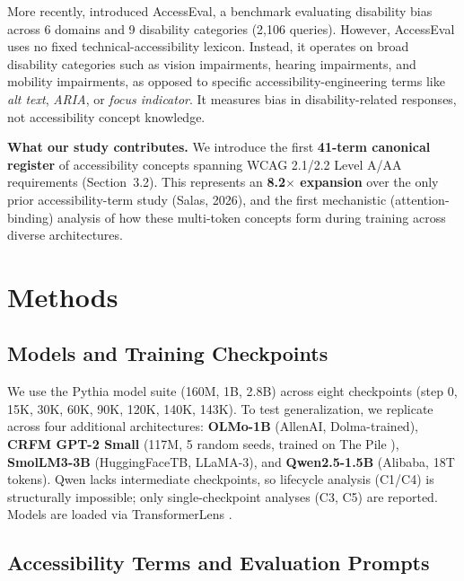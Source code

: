 \documentclass[10pt]{article} %
\begin{document}
More recently, \citet{panda2025accesseval} introduced AccessEval, a benchmark evaluating disability bias across 6 domains and 9 disability categories (2,106 queries).
However, AccessEval uses no fixed technical-accessibility lexicon. Instead, it operates on broad disability categories such as vision impairments, hearing impairments, and mobility impairments, as opposed to specific accessibility-engineering terms like \textit{alt text}, \textit{ARIA}, or \textit{focus indicator}.
It measures bias in disability-related responses, not accessibility concept knowledge.

\textbf{What our study contributes.}
We introduce the first \textbf{41-term canonical register} of accessibility concepts spanning WCAG 2.1/2.2 Level A/AA requirements (Section~3.2).
This represents an \textbf{8.2$\times$ expansion} over the only prior accessibility-term study (Salas, 2026), and the first mechanistic (attention-binding) analysis of how these multi-token concepts form during training across diverse architectures.

\section{Methods}

\subsection{Models and Training Checkpoints}

We use the Pythia model suite \citep{biderman2023pythia} (160M, 1B, 2.8B) across eight checkpoints (step 0, 15K, 30K, 60K, 90K, 120K, 140K, 143K).
To test generalization, we replicate across four additional architectures:
\textbf{OLMo-1B} (AllenAI, Dolma-trained), \textbf{CRFM GPT-2 Small} (117M, 5 random seeds, trained on The Pile \citep{gao2020pile}), \textbf{SmolLM3-3B} (HuggingFaceTB, LLaMA-3), and \textbf{Qwen2.5-1.5B} (Alibaba, 18T tokens).
Qwen lacks intermediate checkpoints, so lifecycle analysis (C1/C4) is structurally impossible; only single-checkpoint analyses (C3, C5) are reported.
Models are loaded via TransformerLens \citep{nanda2023transformerlens}.

\subsection{Accessibility Terms and Evaluation Prompts}
\end{document}
